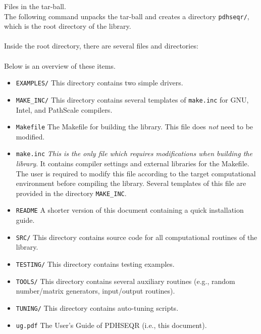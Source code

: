 \documentclass{article}
\begin{document}
\begin{paragraph}
{Files in the tar-ball.}~\\
The following command unpacks the tar-ball and creates a directory
\texttt{pdhseqr/}, which is the root directory of the library.\\
\medskip
{}\\
\medskip
Inside the root directory, there are several files and directories:\\
\medskip
{}\\
\medskip
Below is an overview of these items.
\begin{itemize}
\item \texttt{EXAMPLES/} This directory contains two simple drivers.
\item \texttt{MAKE\_INC/} This directory contains several templates of
\texttt{make.inc} for GNU, Intel, and PathScale compilers.
\item \texttt{Makefile} The Makefile for building the library.
This file does \emph{not} need to be modified.
\item \texttt{make.inc}
\emph{This is the only file which requires modifications when building the
library}.
It contains compiler settings and external libraries for the Makefile.
The user is required to modify this file according to the target computational
environment before compiling the library.
Several templates of this file are provided in the directory
\texttt{MAKE\_INC}.
\item \texttt{README}
A shorter version of this document containing a quick installation guide.
\item \texttt{SRC/}
This directory contains source code for all computational routines of the
library.
\item \texttt{TESTING/} This directory contains testing examples.
\item \texttt{TOOLS/} This directory contains several auxiliary routines
(e.g., random number/matrix generators, input/output routines).
\item \texttt{TUNING/} This directory contains auto-tuning scripts.
\item \texttt{ug.pdf}
The User's Guide of PDHSEQR (i.e., this document).
\end{itemize}
\end{paragraph}
\end{document}
